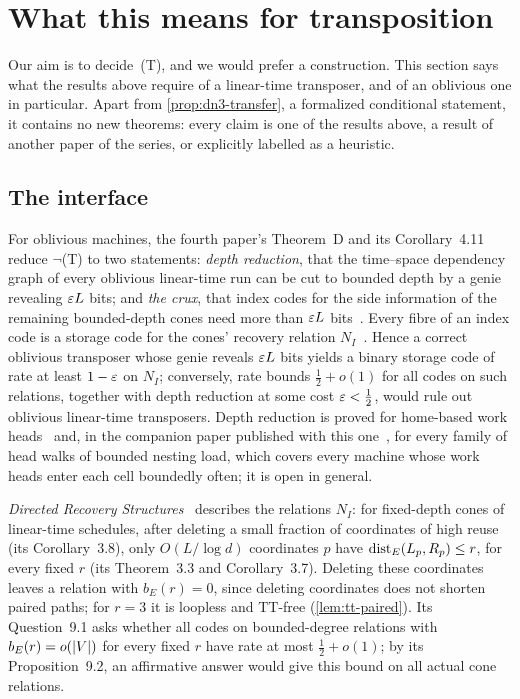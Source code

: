 \section{What this means for transposition}\label{sec:construction}

Our aim is to decide~(T), and we would prefer a construction. This section says what the results above require of a
linear-time transposer, and of an oblivious one in particular. Apart from \cref{prop:dn3-transfer}, a formalized
conditional statement, it contains no new theorems: every claim is one of the results above, a result of another
paper of the series, or explicitly labelled as a heuristic.

\subsection{The interface}\label{sec:con-interface}

For oblivious machines, the fourth paper's Theorem~D and its Corollary~4.11~\cite[Theorem~4.10 and
Corollary~4.11]{FourthPaper2026} reduce $\neg$(T) to two statements: \emph{depth reduction}, that the time--space dependency graph of every oblivious linear-time run can be cut
to bounded depth by a genie revealing $\varepsilon L$ bits; and \emph{the crux}, that index codes for the side information of
the remaining bounded-depth cones need more than $\varepsilon L$ bits~\cite[Definition~4.8]{FourthPaper2026}. Every fibre of an
index code is a storage code for the cones' recovery relation $N_I$~\cite[Remark~4.9(b)]{FourthPaper2026}. Hence a correct
oblivious transposer whose genie reveals $\varepsilon L$ bits yields a binary storage code of rate at least $1-\varepsilon$ on $N_I$;
conversely, rate bounds $\frac12+o(1)$ for all codes on such relations, together with depth reduction at some cost
$\varepsilon<\frac12$, would rule out oblivious linear-time transposers. Depth reduction is proved for home-based work
heads~\cite{FourthPaper2026} and, in the companion paper published with this one~\cite{EighthPaper2026}, for every family
of head walks of bounded nesting load, which covers every machine whose work heads enter each cell boundedly often; it is
open in general.

\emph{Directed Recovery Structures}~\cite{DirectedRecovery2026} describes the relations $N_I$: for fixed-depth cones of
linear-time schedules, after deleting a small fraction of coordinates of high reuse (its Corollary~3.8), only
$O(L/\log d)$ coordinates $p$ have $\operatorname{dist}_E(L_p,R_p)\le r$, for every fixed $r$ (its Theorem~3.3 and Corollary~3.7).
Deleting these coordinates leaves a relation with $b_E(r)=0$, since deleting coordinates does not shorten paired paths;
for $r=3$ it is loopless and TT-free (\cref{lem:tt-paired}). Its Question~9.1 asks whether all codes on bounded-degree
relations with $b_E(r)=o(\lvert V \rvert)$ for every fixed $r$ have rate at most $\frac12+o(1)$; by its Proposition~9.2, an
affirmative answer would give this bound on all actual cone relations.

